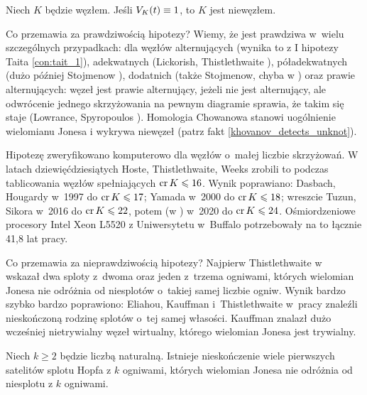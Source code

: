 \begin{conjecture}
%
\label{con:jones}%
    Niech $K$ będzie węzłem.
    Jeśli $V_K(t) \equiv 1$, to $K$ jest niewęzłem.
\end{conjecture}

Co przemawia za prawdziwością hipotezy?
Wiemy, że jest prawdziwa w~wielu szczególnych przypadkach: dla węzłów alternujących (wynika to z I hipotezy Taita \ref{con:tait_1}), adekwatnych (Lickorish, Thistlethwaite \cite{lickorish1988}), póładekwatnych (dużo później Stojmenow \cite{stoimenow2011}), dodatnich (także Stojmenow, chyba w \cite{stoimenow2003}) oraz prawie alternujących: węzeł jest prawie alternujący, jeżeli nie jest alternujący, ale odwrócenie jednego skrzyżowania na pewnym diagramie sprawia, że takim się staje (Lowrance, Spyropoulos \cite{lowrance2017}).
%
%
%
%
%
%
%
%
%
%
Homologia Chowanowa stanowi uogólnienie wielomianu Jonesa i wykrywa niewęzeł (patrz fakt \ref{khovanov_detects_unknot}).
%

Hipotezę zweryfikowano komputerowo dla węzłów o~małej liczbie skrzyżowań.
W latach dziewięćdziesiątych Hoste, Thistlethwaite, Weeks \cite{thistlethwaite1998} zrobili to podczas tablicowania węzłów spełniających $\operatorname{cr} K \leqslant 16$.
%
%
%
Wynik poprawiano:
Dasbach, Hougardy \cite{hougardy1997} w~1997 do $\operatorname{cr} K \leqslant 17$; 
%
%
Yamada \cite{yamada1900} w~2000 do $\operatorname{cr} K \leqslant 18$;
%
wreszcie Tuzun, Sikora \cite{tuzun2018} w~2016 do $\operatorname{cr} K \leqslant 22$,
%
%
potem (w \cite{tuzun2021}) w~2020 do $\operatorname{cr} K \leqslant 24$.
Ośmiordzeniowe procesory Intel Xeon L5520 z Uniwersytetu w~Buffalo potrzebowały na to łącznie 41,8 lat pracy.

Co przemawia za nieprawdziwością hipotezy?
Najpierw Thistlethwaite w~\cite{thistlethwaite2001} wskazał dwa sploty z~dwoma oraz jeden z~trzema ogniwami, których wielomian Jonesa nie odróżnia od niesplotów o~takiej samej liczbie ogniw.
%
Wynik bardzo szybko bardzo poprawiono: Eliahou, Kauffman i~Thistlethwaite w~pracy \cite{eliahou2003} znaleźli nieskończoną rodzinę splotów o~tej samej własości.
%
%
Kauffman znalazł dużo wcześniej nietrywialny węzeł wirtualny, którego wielomian Jonesa jest trywialny.

\begin{proposition}
%
%
    Niech $k \ge 2$ będzie liczbą naturalną.
    Istnieje nieskończenie wiele pierwszych satelitów splotu Hopfa z $k$ ogniwami, których wielomian Jonesa nie odróżnia od niesplotu z $k$ ogniwami.
\end{proposition}

